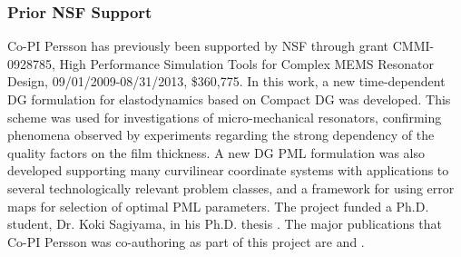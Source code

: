 \documentclass[11pt]{article}
\begin{document}
\subsubsection{Prior NSF Support}

Co-PI Persson has previously been supported by NSF through grant CMMI-0928785, High Performance Simulation Tools for Complex MEMS Resonator Design, 09/01/2009-08/31/2013, \$360,775. In this work, a new time-dependent DG formulation for elastodynamics based on Compact DG was developed. This scheme was used for investigations of micro-mechanical resonators, confirming phenomena observed by experiments regarding the strong dependency of the quality factors on the film thickness. A new DG PML formulation was also developed supporting many curvilinear coordinate systems with applications to several technologically relevant problem classes, and a framework for using error maps for selection of optimal PML parameters.  The project funded a Ph.D. student, Dr. Koki Sagiyama, in his Ph.D. thesis \cite{sagiyama13thesis}. The major publications that Co-PI Persson was co-authoring as part of this project are \cite{govindjee12resonator} and \cite{sagiyama14pml}.

%

{\vbox{}}
\end{document}
